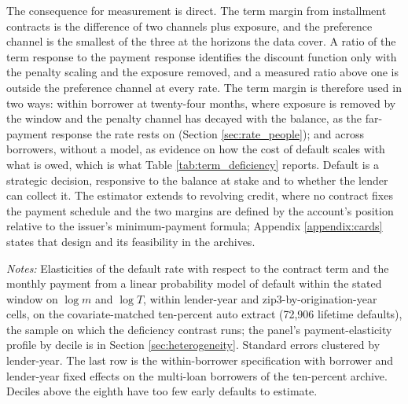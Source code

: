 The consequence for measurement is direct. The term margin from installment contracts is the difference of two channels plus exposure, and the preference channel is the smallest of the three at the horizons the data cover. A ratio of the term response to the payment response identifies the discount function only with the penalty scaling and the exposure removed, and a measured ratio above one is outside the preference channel at every rate. The term margin is therefore used in two ways: within borrower at twenty-four months, where exposure is removed by the window and the penalty channel has decayed with the balance, as the far-payment response the rate rests on (Section \ref{sec:rate_people}); and across borrowers, without a model, as evidence on how the cost of default scales with what is owed, which is what Table \ref{tab:term_deficiency} reports. Default is a strategic decision, responsive to the balance at stake and to whether the lender can collect it. The estimator extends to revolving credit, where no contract fixes the payment schedule and the two margins are defined by the account's position relative to the issuer's minimum-payment formula; Appendix \ref{appendix:cards} states that design and its feasibility in the archives.

\begin{table}[ht]
\centering
\caption{The term margin by credit-score decile and horizon (auto loans)}
\label{tab:term_by_score}
\resizebox{\textwidth}{!}{}
\vspace{0.5em}
\begin{minipage}{0.95\textwidth}
\small \textit{Notes:} Elasticities of the default rate with respect to the contract term and the monthly payment from a linear probability model of default within the stated window on $\log m$ and $\log T$, within lender-year and zip3-by-origination-year cells, on the covariate-matched ten-percent auto extract (72,906 lifetime defaults), the sample on which the deficiency contrast runs; the panel's payment-elasticity profile by decile is in Section \ref{sec:heterogeneity}. Standard errors clustered by lender-year. The last row is the within-borrower specification with borrower and lender-year fixed effects on the multi-loan borrowers of the ten-percent archive. Deciles above the eighth have too few early defaults to estimate.
\end{minipage}
\end{table}


